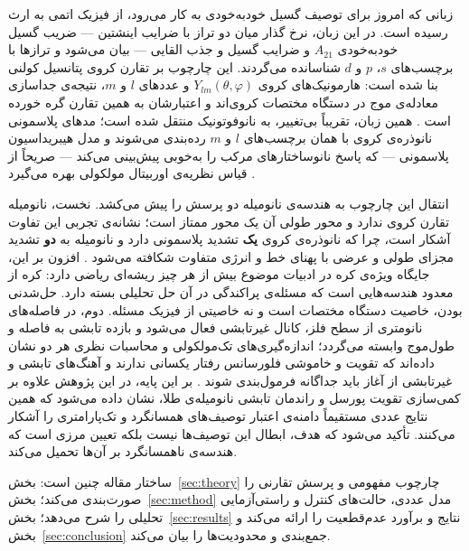 زبانی که امروز برای توصیف گسیل خودبه‌خودی به کار می‌رود، از فیزیک اتمی به
ارث رسیده است. در این زبان، نرخ گذار میان دو تراز با ضرایب اینشتین —
ضریب گسیل خودبه‌خودی $A_{21}$ و ضرایب گسیل و جذب القایی — بیان می‌شود و
ترازها با برچسب‌های $s$، $p$ و $d$ شناسانده می‌گردند. این چارچوب بر تقارن
کروی پتانسیل کولنی بنا شده است: هارمونیک‌های کروی
$Y_{lm}(\theta,\varphi)$ و عددهای $l$ و $m$، نتیجه‌ی جداسازی معادله‌ی موج
در دستگاه مختصات کروی‌اند و اعتبارشان به همین تقارن گره خورده است
\cite{griffiths2018introduction, jackson1999classical}. همین زبان، تقریباً
بی‌تغییر، به نانوفوتونیک منتقل شده است؛ مدهای پلاسمونی نانوذره‌ی کروی با
همان برچسب‌های $l$ و $m$ رده‌بندی می‌شوند و مدل هیبریداسیون پلاسمونی — که
پاسخ نانوساختارهای مرکب را به‌خوبی پیش‌بینی می‌کند — صریحاً از قیاس
نظریه‌ی اوربیتال مولکولی بهره می‌گیرد \cite{prodan2003hybridization}.

انتقال این چارچوب به هندسه‌ی نانومیله دو پرسش را پیش می‌کشد. نخست،
نانومیله تقارن کروی ندارد و محور طولی آن یک محور ممتاز است؛ نشانه‌ی
تجربی این تفاوت آشکار است، چرا که نانوذره‌ی کروی \textbf{یک} تشدید
پلاسمونی دارد و نانومیله به \textbf{دو} تشدید مجزای طولی و عرضی با پهنای
خط و انرژی متفاوت شکافته می‌شود \cite{sonnichsen2002drastic}. افزون بر
این، جایگاه ویژه‌ی کره در ادبیات موضوع بیش از هر چیز ریشه‌ای ریاضی دارد:
کره از معدود هندسه‌هایی است که مسئله‌ی پراکندگی در آن حل تحلیلی بسته
دارد. حل‌شدنی بودن، خاصیت دستگاه مختصات است و نه خاصیتی از فیزیک مسئله.
دوم، در فاصله‌های نانومتری از سطح فلز، کانال غیرتابشی فعال می‌شود و بازده
تابشی به فاصله و طول‌موج وابسته می‌گردد؛ اندازه‌گیری‌های تک‌مولکولی و
محاسبات نظری هر دو نشان داده‌اند که تقویت و خاموشی فلورسانس رفتار یکسانی
ندارند و آهنگ‌های تابشی و غیرتابشی از آغاز باید جداگانه فرمول‌بندی شوند
\cite{anger2006enhancement, bharadwaj2007spectral, carminati2006radiative}.
بر این پایه، در این پژوهش علاوه بر کمی‌سازی تقویت پورسل و راندمان تابشی
نانومیله‌ی طلا، نشان داده می‌شود که همین نتایج عددی مستقیماً دامنه‌ی
اعتبار توصیف‌های همسانگرد و تک‌پارامتری را آشکار می‌کنند. تأکید می‌شود که
هدف، ابطال این توصیف‌ها نیست بلکه تعیین مرزی است که هندسه‌ی ناهمسانگرد بر
آن‌ها تحمیل می‌کند.

ساختار مقاله چنین است: بخش~\ref{sec:theory} چارچوب مفهومی و پرسش تقارنی
را صورت‌بندی می‌کند؛ بخش~\ref{sec:method} مدل عددی، حالت‌های کنترل و
راستی‌آزمایی تحلیلی را شرح می‌دهد؛ بخش~\ref{sec:results} نتایج و برآورد
عدم‌قطعیت را ارائه می‌کند و بخش~\ref{sec:conclusion} جمع‌بندی و
محدودیت‌ها را بیان می‌کند.
